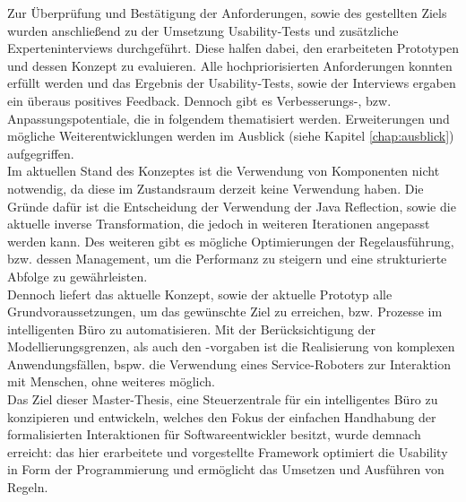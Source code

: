     \linebreak
    Zur Überprüfung und Bestätigung der Anforderungen, sowie des gestellten Ziels wurden anschließend zu der Umsetzung Usability-Tests und zusätzliche 
    Experteninterviews durchgeführt. Diese halfen dabei, den erarbeiteten Prototypen und dessen Konzept zu evaluieren. Alle hochpriorisierten 
    Anforderungen konnten erfüllt werden und das Ergebnis der Usability-Tests, sowie der Interviews ergaben ein überaus positives Feedback. Dennoch 
    gibt es Verbesserungs-, bzw. Anpassungspotentiale, die in folgendem thematisiert werden. Erweiterungen und mögliche Weiterentwicklungen werden 
    im Ausblick (siehe Kapitel \ref{chap:ausblick}) aufgegriffen. 
    \\
    \linebreak 
    Im aktuellen Stand des Konzeptes ist die Verwendung von Komponenten nicht notwendig, da diese im Zustandsraum derzeit keine Verwendung haben. Die 
    Gründe dafür ist die Entscheidung der Verwendung der Java Reflection, sowie die aktuelle inverse Transformation, die jedoch in weiteren 
    Iterationen angepasst werden kann. Des weiteren gibt es mögliche Optimierungen der Regelausführung, bzw. dessen Management, um die Performanz 
    zu steigern und eine strukturierte Abfolge zu gewährleisten.  
    \\
    Dennoch liefert das aktuelle Konzept, sowie der aktuelle Prototyp alle Grundvoraussetzungen, um das gewünschte Ziel zu 
    erreichen, bzw. Prozesse im intelligenten Büro zu automatisieren. Mit der Berücksichtigung der Modellierungsgrenzen, als 
    auch den -vorgaben ist die Realisierung von komplexen Anwendungsfällen, bspw. die Verwendung eines 
    Service-Roboters zur Interaktion mit Menschen, ohne weiteres möglich. 
    \\
    \linebreak
    Das Ziel dieser Master-Thesis, eine Steuerzentrale für ein intelligentes Büro zu konzipieren und entwickeln, welches den Fokus der 
    einfachen Handhabung der formalisierten Interaktionen für Softwareentwickler besitzt, wurde demnach erreicht: das hier erarbeitete 
    und vorgestellte Framework optimiert die Usability in Form der Programmierung und ermöglicht das Umsetzen und Ausführen von Regeln. 
